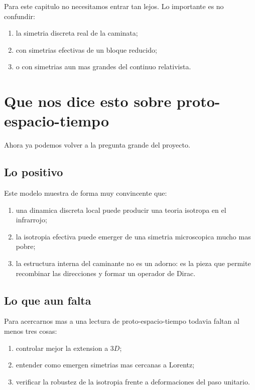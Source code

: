Para este capitulo no necesitamos entrar tan lejos. Lo importante es no confundir:
\begin{enumerate}[label=\arabic*.]
    \item la simetria discreta real de la caminata;
    \item con simetrias efectivas de un bloque reducido;
    \item o con simetrias aun mas grandes del continuo relativista.
\end{enumerate}

\section{Que nos dice esto sobre proto-espacio-tiempo}
Ahora ya podemos volver a la pregunta grande del proyecto.

\subsection{Lo positivo}
Este modelo muestra de forma muy convincente que:
\begin{enumerate}[label=\arabic*.]
    \item una dinamica discreta local puede producir una teoria isotropa en el infrarrojo;
    \item la isotropia efectiva puede emerger de una simetria microscopica mucho mas pobre;
    \item la estructura interna del caminante no es un adorno: es la pieza que permite recombinar las direcciones y formar un operador de Dirac.
\end{enumerate}

\subsection{Lo que aun falta}
Para acercarnos mas a una lectura de proto-espacio-tiempo todavia faltan al menos tres cosas:
\begin{enumerate}[label=\arabic*.]
    \item controlar mejor la extension a \(3D\);
    \item entender como emergen simetrias mas cercanas a Lorentz;
    \item verificar la robustez de la isotropia frente a deformaciones del paso unitario.
\end{enumerate}

